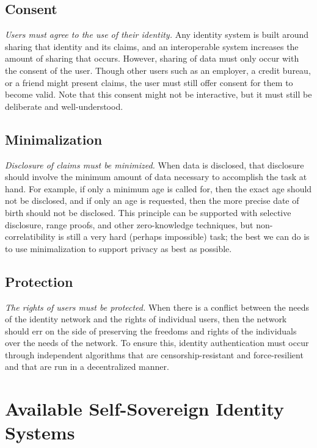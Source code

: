 \subsection{Consent} \textit{Users must agree to the use of their identity.} Any identity system is built around sharing that identity and its claims, and an interoperable system increases the amount of sharing that occurs. However, sharing of data must only occur with the consent of the user. Though other users such as an employer, a credit bureau, or a friend might present claims, the user must still offer consent for them to become valid. Note that this consent might not be interactive, but it must still be deliberate and well-understood.
\subsection{Minimalization} \textit{Disclosure of claims must be minimized.} When data is disclosed, that disclosure should involve the minimum amount of data necessary to accomplish the task at hand. For example, if only a minimum age is called for, then the exact age should not be disclosed, and if only an age is requested, then the more precise date of birth should not be disclosed. This principle can be supported with selective disclosure, range proofs, and other zero-knowledge techniques, but non-correlatibility is still a very hard (perhaps impossible) task; the best we can do is to use minimalization to support privacy as best as possible.
\subsection{Protection} \textit{The rights of users must be protected.} When there is a conflict between the needs of the identity network and the rights of individual users, then the network should err on the side of preserving the freedoms and rights of the individuals over the needs of the network. To ensure this, identity authentication must occur through independent algorithms that are censorship-resistant and force-resilient and that are run in a decentralized manner.


\section{Available Self-Sovereign Identity Systems}
\label{sec:ssi_systems}
